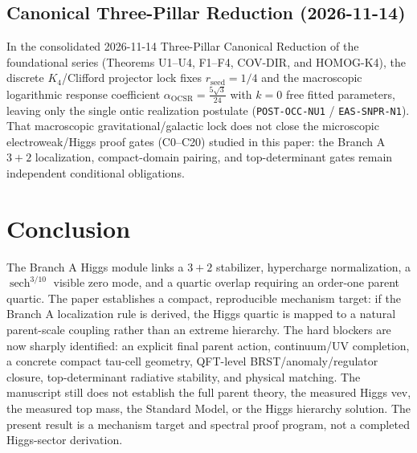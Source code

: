 \documentclass[11pt]{article}
\begin{document}
\subsection{Canonical Three-Pillar Reduction (2026-11-14)}
In the consolidated 2026-11-14 Three-Pillar Canonical Reduction of the foundational series (Theorems U1--U4, F1--F4, COV-DIR, and HOMOG-K4), the discrete $K_4$/Clifford projector lock fixes $r_{\mathrm{seed}}=1/4$ and the macroscopic logarithmic response coefficient $\alpha_{\mathrm{OCSR}}=\frac{5\sqrt{3}}{24}$ with $k=0$ free fitted parameters, leaving only the single ontic realization postulate (\texttt{POST-OCC-NU1} / \texttt{EAS-SNPR-N1}). That macroscopic gravitational/galactic lock does not close the microscopic electroweak/Higgs proof gates (C0--C20) studied in this paper: the Branch A $3+2$ localization, compact-domain pairing, and top-determinant gates remain independent conditional obligations.

\section{Conclusion}
The Branch A Higgs module links a $3+2$ stabilizer, hypercharge normalization,
a $\operatorname{sech}^{3/10}$ visible zero mode, and a quartic overlap
requiring an order-one parent quartic. The paper establishes a compact,
reproducible mechanism target: if the Branch A localization rule is derived,
the Higgs quartic is mapped to a natural parent-scale coupling rather than an
extreme hierarchy. The hard blockers are now sharply identified: an explicit
final parent action, continuum/UV completion, a concrete compact tau-cell
geometry, QFT-level BRST/anomaly/regulator closure, top-determinant radiative
stability, and physical matching. The manuscript still does not establish the
full parent theory, the measured Higgs vev, the measured top mass, the Standard
Model, or the Higgs hierarchy solution. The present result is a mechanism
target and spectral proof program, not a completed Higgs-sector derivation.



\end{document}
